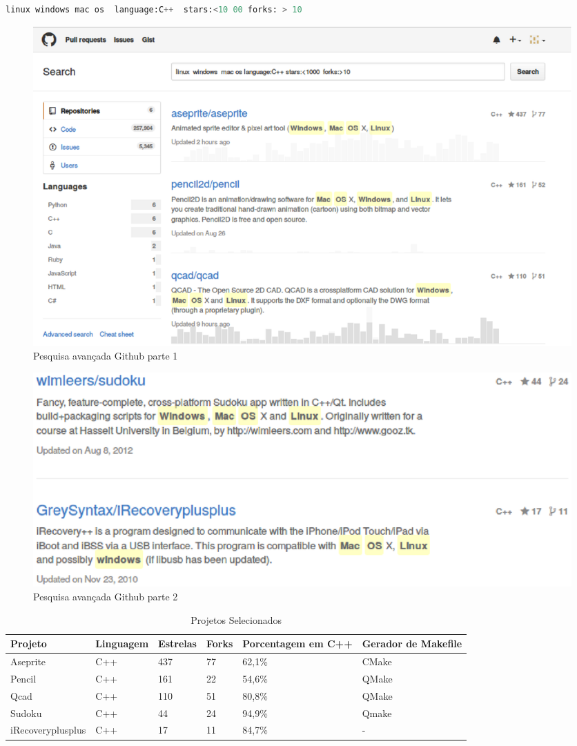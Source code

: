 \begin{lstlisting}[language=python, caption={Busca avançada github },
                  label=busca_avanacada_github]
     linux windows mac os  language:C++  stars:<10 00 forks: > 10
\end{lstlisting}


\begin{figure}[h]
    \centering
        \includegraphics[scale=0.50]{figuras/github_advanced_search.eps}
    \caption{Pesquisa avançada Github parte 1}
    \label{pesquisa_github}
\end{figure}
\begin{figure}[h]
    \centering
        \includegraphics[scale=0.50]{figuras/github_advanced_search_2.eps}
    \caption{Pesquisa avançada Github parte 2}
    \label{pesquisa_github}
\end{figure}

\begin{table}[h]
\centering
\tiny
\caption{Projetos Selecionados}
\label{projetos_selecionados}
\begin{tabular}{llllll}
\textbf{Projeto} & \textbf{Linguagem} & \textbf{Estrelas} & \textbf{Forks} & \textbf{Porcentagem em C++} & \textbf{Gerador de Makefile}\\ \toprule
Aseprite & C++ & 437  & 77  & 62,1\% & CMake \\ \midrule 
Pencil & C++ &  161 & 22  & 54,6\%   & QMake \\ \midrule
Qcad & C++ & 110 & 51 & 80,8\%       & QMake \\ \midrule 
Sudoku & C++ &  44  & 24 & 94,9\%    & Qmake \\ \midrule
iRecoveryplusplus & C++ & 17 & 11 & 84,7\% & -  \\ \bottomrule
\end{tabular} 
\end{table}


